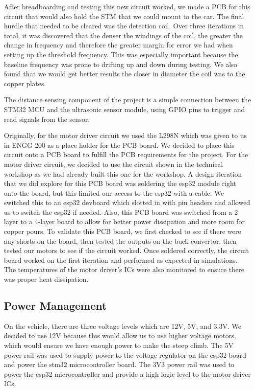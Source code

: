 \documentclass[11pt]{article}
\begin{document}
After breadboarding and testing this new circuit worked, we made a PCB for this circuit that would also hold the STM that we could mount to the car. The final hurdle that needed to be cleared was the detection coil. Over three iterations in total, it was discovered that the denser the windings of the coil, the greater the change in frequency and therefore the greater margin for error we had when setting up the threshold frequency. This was especially important because the baseline frequency was prone to drifting up and down during testing. We also found that we would get better results the closer in diameter the coil was to the copper plates.

The distance sensing component of the project is a simple connection between the STM32 MCU and the ultrasonic sensor module, using GPIO pins to trigger and read signals from the sensor.

Originally, for the motor driver circuit we used the L298N which was given to us in ENGG 200 as a place holder for the PCB board. We decided to place this circuit onto a PCB board to fulfill the PCB requirements for the project. For the motor driver circuit, we decided to use the circuit shown in the technical workshop as we had already built this one for the workshop. A design iteration that we did explore for this PCB board was soldering the esp32 module right onto the board, but this limited our access to the esp32 with a cable. We switched this to an esp32 devboard which slotted in with pin headers and allowed us to switch the esp32 if needed. Also, this PCB board was switched from a 2 layer to a 4-layer board to allow for better power dissipation and more room for copper pours. To validate this PCB board, we first checked to see if there were any shorts on the board, then tested the outputs on the buck convertor, then tested our motors to see if the circuit worked. Once soldered correctly, the circuit board worked on the first iteration and performed as expected in simulations. The temperatures of the motor driver's ICs were also monitored to ensure there was proper heat dissipation.

\subsection{Power Management}
On the vehicle, there are three voltage levels which are 12V, 5V, and 3.3V. We decided to use 12V because this would allow us to use higher voltage motors, which would ensure we have enough power to make the steep climb. The 5V power rail was used to supply power to the voltage regulator on the esp32 board and power the stm32 microcontroller board. The 3V3 power rail was used to power the esp32 microcontroller and provide a high logic level to the motor driver ICs.
\end{document}
